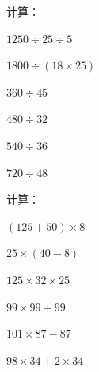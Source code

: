 \documentclass[a4paper,12pt]{ctexart}
\begin{document}
\begin{exercise}
\item 计算：
  \begin{subexercise}
    \item $1250\div25\div5$
    \item $1800\div(18\times25)$
    \item $360\div45$
    \item $480\div32$
    \item $540\div36$
    \item $720\div48$
  \end{subexercise}

\item 计算：
  \begin{subexercise}
    \item $(125+50)\times8$
    \item $25\times(40-8)$
    \item $125\times32\times25$
    \item $99\times99+99$
    \item $101\times87-87$
    \item $98\times34+2\times34$
  \end{subexercise}
\end{exercise}

\newpage



\bigskip
\end{document}

